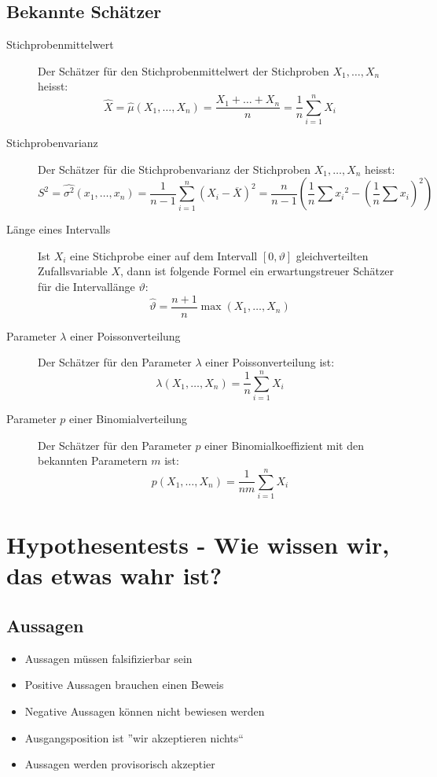\subsection{Bekannte Schätzer}
\begin{description}
  \item[Stichprobenmittelwert] Der Schätzer für den
    Stichprobenmittelwert der Stichproben $X_1, \dots, X_n$ heisst:
    \[ \hat{X} = \hat{\mu}(X_1, \dots, X_n) = \frac{X_1 + \ldots +
    X_n}{n} = \frac{1}{n} \sum_{i=1}^{n} X_i \]
  \item[Stichprobenvarianz] Der Schätzer für die Stichprobenvarianz der
    Stichproben $X_1, \dots, X_n$ heisst:
    \[ S^2 = \hat{\sigma^2}(x_1, \dots, x_n) = \frac{1}{n-1}
    \sum_{i=1}^{n}(X_i - \overline{X})^2 = \frac{n}{n-1}\left( \frac{1}{n}
    \sum {x_i}^2 - \left(\frac{1}{n} \sum x_i\right)^2\right)\]
  \item[Länge eines Intervalls] Ist $X_i$ eine Stichprobe einer auf dem
    Intervall $[0, \vartheta]$ gleichverteilten Zufallsvariable $X$, dann ist
    folgende Formel ein erwartungstreuer Schätzer für die Intervallänge
    $\vartheta$:
    \[ \hat{\vartheta} = \frac{n+1}{n} \operatorname{max}(X_1, \dots, X_n)\]
  \item[Parameter $\lambda$ einer Poissonverteilung] Der Schätzer für
    den Parameter $\lambda$ einer Poissonverteilung ist:
    \[ \lambda(X_1, \dots, X_n) = \frac{1}{n} \sum_{i=1}^{n} X_i \]
  \item[Parameter $p$ einer Binomialverteilung] Der Schätzer für den
    Parameter $p$ einer Binomialkoeffizient mit den bekannten Parametern
    $m$ ist:
    \[ p(X_1, \dots, X_n) = \frac{1}{nm} \sum_{i=1}^{n} X_i \]
\end{description}

\section{Hypothesentests - Wie wissen wir, das etwas wahr ist?}
\subsection{Aussagen}
\begin{itemize}
  \item Aussagen müssen falsifizierbar sein
  \item Positive Aussagen brauchen einen Beweis
  \item Negative Aussagen können nicht bewiesen werden
  \item Ausgangsposition ist ''wir akzeptieren nichts``
  \item Aussagen werden provisorisch akzeptier
\end{itemize}


